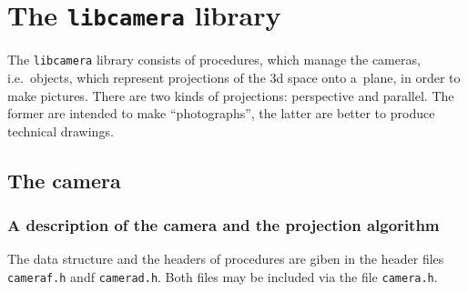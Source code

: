 

\chapter{The \texttt{libcamera} library}

The \texttt{libcamera} library consists of procedures, which manage the
cameras, i.e.\ objects, which represent projections of the 3d space
onto a~plane, in order to make pictures. There are two kinds of projections:
perspective and parallel. The former are intended to make ``photographs'',
the latter are better to produce technical drawings.


\section{The camera}

\subsection{A description of the camera and the projection algorithm}

The data structure and the headers of procedures are giben in the header
files \texttt{cameraf.h} andf \texttt{camerad.h}.
Both files may be included via the file \texttt{camera.h}.

